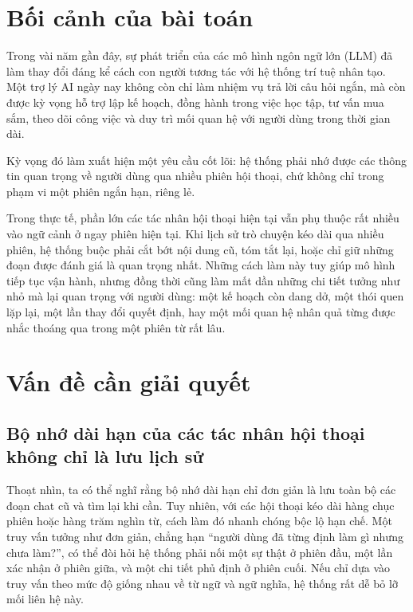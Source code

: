 \documentclass[../main.tex]{subfiles}
\begin{document}
\section{Bối cảnh của bài toán}

Trong vài năm gần đây, sự phát triển của các mô hình ngôn ngữ lớn (LLM) đã làm thay đổi đáng kể cách con người tương tác với hệ thống trí tuệ nhân tạo. Một trợ lý AI ngày nay không còn chỉ làm nhiệm vụ trả lời câu hỏi ngắn, mà còn được kỳ vọng hỗ trợ lập kế hoạch, đồng hành trong việc học tập, tư vấn mua sắm, theo dõi công việc và duy trì mối quan hệ với người dùng trong thời gian dài. 

Kỳ vọng đó làm xuất hiện một yêu cầu cốt lõi: hệ thống phải nhớ được các thông tin quan trọng về người dùng qua nhiều phiên hội thoại, chứ không chỉ trong phạm vi một phiên ngắn hạn, riêng lẻ.

Trong thực tế, phần lớn các tác nhân hội thoại hiện tại vẫn phụ thuộc rất nhiều vào ngữ cảnh ở ngay phiên hiện tại. Khi lịch sử trò chuyện kéo dài qua nhiều phiên, hệ thống buộc phải cắt bớt nội dung cũ, tóm tắt lại, hoặc chỉ giữ những đoạn được đánh giá là quan trọng nhất. Những cách làm này tuy giúp mô hình tiếp tục vận hành, nhưng đồng thời cũng làm mất dần những chi tiết tưởng như nhỏ mà lại quan trọng với người dùng: một kế hoạch còn dang dở, một thói quen lặp lại, một lần thay đổi quyết định, hay một mối quan hệ nhân quả từng được nhắc thoáng qua trong một phiên từ rất lâu.

\section{Vấn đề cần giải quyết}

\subsection{Bộ nhớ dài hạn của các tác nhân hội thoại không chỉ là lưu lịch sử}

Thoạt nhìn, ta có thể nghĩ rằng bộ nhớ dài hạn chỉ đơn giản là lưu toàn bộ các đoạn chat cũ và tìm lại khi cần. Tuy nhiên, với các hội thoại kéo dài hàng chục phiên hoặc hàng trăm nghìn từ, cách làm đó nhanh chóng bộc lộ hạn chế. Một truy vấn tưởng như đơn giản, chẳng hạn ``người dùng đã từng định làm gì nhưng chưa làm?'', có thể đòi hỏi hệ thống phải nối một sự thật ở phiên đầu, một lần xác nhận ở phiên giữa, và một chi tiết phủ định ở phiên cuối. Nếu chỉ dựa vào truy vấn theo mức độ giống nhau về từ ngữ và ngữ nghĩa, hệ thống rất dễ bỏ lỡ mối liên hệ này.
\end{document}
